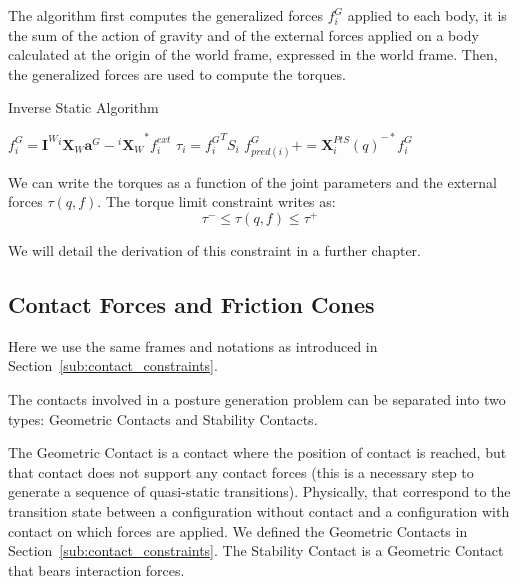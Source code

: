 The algorithm first computes the generalized forces $f^G_i$ applied to each body, it is the sum of the action of gravity and of the external forces applied on a body calculated at the origin of the world frame, expressed in the world frame.
Then, the generalized forces are used to compute the torques.

\begin{algorithm}
  \caption{Inverse Static Algorithm}
\label{IS}
\begin{algorithmic}
  \State$f^G_i = \mathbf{I}^W {}^i\mathbf{X}_W \mathbf{a}^G - {{}^i\mathbf{X}_W}^*f_i^{ext}$
  \EndFor{}
  \State$\tau_i = {f^G_i}^T S_i$
  \State$f^G_{pred(i)} += {\mathbf{X}^{PtS}_i(q)}^{-*} f^G_i$
  \EndIf{}
  \EndFor{}
\end{algorithmic}
\end{algorithm}

We can write the torques as a function of the joint parameters and the external forces $\tau(q,f)$.
The torque limit constraint writes as:
\begin{equation}
  \boxed{\tau^- \leq \tau(q,f) \leq \tau^+}
\end{equation}

We will detail the derivation of this constraint in a further chapter.



\subsection{Contact Forces and Friction Cones}
\label{subsec:contact_forces_and_friction_cones}


Here we use the same frames and notations as introduced in Section~\ref{sub:contact_constraints}.

The contacts involved in a posture generation problem can be separated into two types: Geometric Contacts and Stability Contacts.

The Geometric Contact is a contact where the position of contact is reached, but that contact does not support any contact forces (this is a necessary step to generate a sequence of quasi-static transitions).
Physically, that correspond to the transition state between a configuration without contact and a configuration with contact on which forces are applied.
We defined the Geometric Contacts in Section~\ref{sub:contact_constraints}.
The Stability Contact is a Geometric Contact that bears interaction forces.

